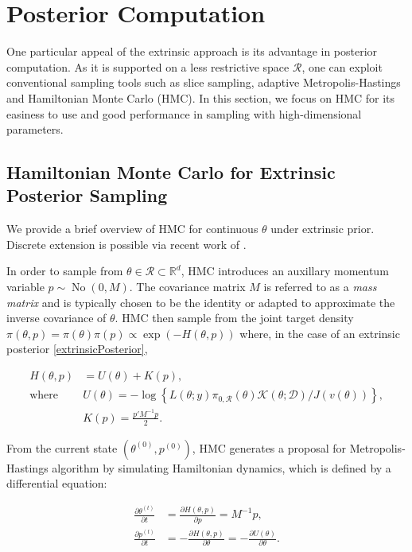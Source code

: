 \documentclass[10pt]{article}
\newcommand{\mc}[1]{\mathcal{#1}}
\DeclareMathOperator{\No}{No}
\DeclareMathOperator{\1}{\mathbbm{1}}
\newcommand{\mass}{M} %
\begin{document}
\section{Posterior Computation}

One particular appeal of the extrinsic approach is its advantage in posterior computation. As it is supported on a less restrictive space $\mc R$, one can exploit conventional sampling tools such as slice sampling, adaptive Metropolis-Hastings and Hamiltonian Monte Carlo (HMC). In this section, we focus on HMC for its easiness to use and good performance in sampling with high-dimensional parameters.

\subsection{Hamiltonian Monte Carlo for Extrinsic Posterior Sampling}

We provide a brief overview of HMC for continuous $\theta$ under extrinsic prior. Discrete extension is possible via recent work of \cite{nishimura2017discontinuous}.

In order to sample from $\theta\in\mc R \subset \mathbb R^d$, HMC introduces an auxillary momentum variable $p \sim \No(0, \mass)$. The covariance matrix $\mass$ is referred to as a \textit{mass matrix} and is typically chosen to be the identity or adapted to approximate the inverse covariance of $\theta$. HMC then sample from the joint target density $\pi(\theta, p) = \pi(\theta) \pi(p) \propto \exp (- H(\theta, p))$ where, in the case of an extrinsic posterior \eqref{extrinsicPosterior}, 


\begin{equation}
\begin{aligned}
H(\theta, p)& = U(\theta)+K(p),\\
\text{where } & U(\theta) = -\log\left\{ L(\theta;y)\pi_{0,\mc R}(\theta) \mc{K}(\theta;\mc D) / J(v(\theta)) \right\},\\
& K(p) = \frac{p'\mass^{-1} p}{2}.
\end{aligned}
\end{equation}

From the current state $(\theta^{(0)},p^{(0)})$, HMC generates a proposal for Metropolis-Hastings algorithm by simulating Hamiltonian dynamics, which is defined by a differential equation:

\begin{equation}
\begin{aligned}
\label{hamiltonian}
\frac{\partial \theta ^{(t)}}{\partial t} & =\frac{\partial H(\theta, p)}{\partial p} = \mass^{-1}p,\\
\frac{\partial p^{(t)}}{\partial t}& =-\frac{\partial H(\theta, p)}{\partial \theta} = -\frac{\partial U(\theta)}{\partial \theta}.
\end{aligned}
\end{equation}
\end{document}
